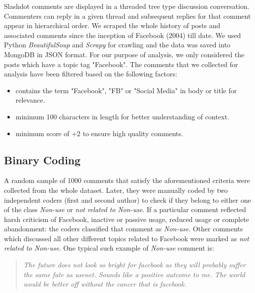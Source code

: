 Slashdot comments are displayed in a threaded tree type discussion conversation. Commenters can reply in a given thread and subsequent replies for that comment appear in hierarchical order. We scraped the whole history of posts and associated comments since the inception of Facebook (2004) till date. We used Python \textit{BeautifulSoup} and \textit{Scrapy} for crawling and the data was saved into MongoDB in JSON format. For our purpose of analysis, we only considered the posts which have a topic tag "Facebook". The comments that we collected for analysis have been filtered based on the following factors: 
\begin{itemize}
    \item contains the term "Facebook", "FB" or "Social Media" in body or title for relevance.
    \item minimum 100 characters in length for better understanding of context.
    \item minimum score of +2 to ensure high quality comments.
\end{itemize}
\subsection{Binary Coding}
A random sample of 1000 comments that satisfy the aforementioned criteria were collected from the whole dataset. Later, they were manually coded by two independent coders (first and second author) to check if they belong to either one of the class \textit{Non-use} or \textit{not related to Non-use}. If a particular comment reflected harsh criticism of Facebook, inactive or passive usage, reduced usage or complete abandonment: the coders classified that comment as \emph{Non-use}. Other comments which discussed all other different topics related to Facebook were marked as \textit{not related to Non-use}. One typical such example of \emph{Non-use} comment is:
\begin{quote}
    \textit{The future does not look so bright for facebook as they will probably suffer the same fate as usenet. Sounds like a positive outcome to me. The world would be better off without the cancer that is facebook.}

\end{quote}

